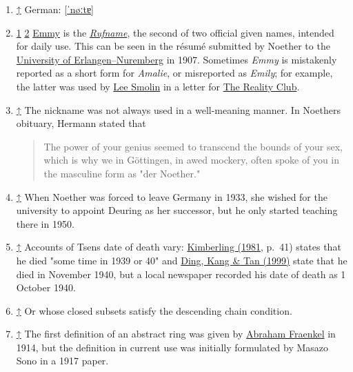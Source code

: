\begin{enumerate}
\item
  {{\href{https://en.wikipedia.org/wiki/Emmy_Noether\#cite_ref-1}{{↑}}} {{German:} \foreignlanguage{ngerman}{\href{https://en.wikipedia.org/wiki/Help:IPA/Standard_German}{{{[}}ˈnøːtɐ{{]}}}}}}
\item
  {{\href{https://en.wikipedia.org/wiki/Emmy_Noether\#cite_ref-Rufname_5-0}{{1}} \href{https://en.wikipedia.org/wiki/Emmy_Noether\#cite_ref-Rufname_5-1}{{2}}} {\href{https://en.wikipedia.org/wiki/Emmy_(given_name)}{Emmy} is the \emph{\href{https://en.wikipedia.org/wiki/Rufname}{Rufname}}, the second of two official given names, intended for daily use. This can be seen in the résumé submitted by Noether to the \href{https://en.wikipedia.org/wiki/University_of_Erlangen–Nuremberg}{University of Erlangen--Nuremberg} in 1907. Sometimes \emph{Emmy} is mistakenly reported as a short form for \emph{Amalie}, or misreported as \emph{Emily}; for example, the latter was used by \href{https://en.wikipedia.org/wiki/Lee_Smolin}{Lee Smolin} in a letter for \href{https://en.wikipedia.org/wiki/The_Reality_Club}{The Reality Club}.}}
\item
  {{\href{https://en.wikipedia.org/wiki/Emmy_Noether\#cite_ref-81}{{↑}}} {The nickname was not always used in a well-meaning manner. In Noether\textquotesingle s obituary, Hermann stated that }}

  \begin{quote}
  The power of your genius seemed to transcend the bounds of your sex, which is why we in Göttingen, in awed mockery, often spoke of you in the masculine form as "der Noether."
  \end{quote}
\item
  {{\href{https://en.wikipedia.org/wiki/Emmy_Noether\#cite_ref-98}{{↑}}} {When Noether was forced to leave Germany in 1933, she wished for the university to appoint Deuring as her successor, but he only started teaching there in 1950.}}
\item
  {{\href{https://en.wikipedia.org/wiki/Emmy_Noether\#cite_ref-106}{{↑}}} {Accounts of Tsen\textquotesingle s date of death vary: \href{https://en.wikipedia.org/wiki/Emmy_Noether\#CITEREFKimberling1981}{Kimberling (1981}, p.{~}41) states that he died "some time in 1939 or 40" and \href{https://en.wikipedia.org/wiki/Emmy_Noether\#CITEREFDingKangTan1999}{Ding, Kang {\&} Tan (1999)} state that he died in November 1940, but a local newspaper recorded his date of death as 1 October 1940.}}
\item
  {{\href{https://en.wikipedia.org/wiki/Emmy_Noether\#cite_ref-207}{{↑}}} {Or whose closed subsets satisfy the descending chain condition.}}
\item
  {{\href{https://en.wikipedia.org/wiki/Emmy_Noether\#cite_ref-213}{{↑}}} {The first definition of an abstract ring was given by \href{https://en.wikipedia.org/wiki/Abraham_Fraenkel}{Abraham Fraenkel} in 1914, but the definition in current use was initially formulated by Masazo Sono in a 1917 paper.}}
\end{enumerate}






